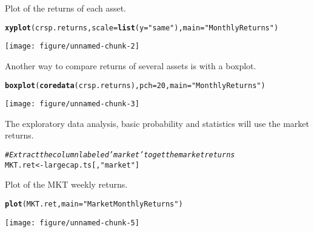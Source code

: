 \documentclass[a4paper]{article}\usepackage[]{graphicx}\usepackage[]{color}
\makeatletter
\def\maxwidth{ %
  \ifdim\Gin@nat@width>\linewidth
    \linewidth
  \else
    \Gin@nat@width
  \fi
}
\newcommand{\hlstr}[1]{\textcolor[rgb]{0.192,0.494,0.8}{#1}}%
\newcommand{\hlcom}[1]{\textcolor[rgb]{0.678,0.584,0.686}{\textit{#1}}}%
\newcommand{\hlkwd}[1]{\textcolor[rgb]{0.737,0.353,0.396}{\textbf{#1}}}%
\newenvironment{kframe}{%
 \def\at@end@of@kframe{}%
 \ifinner\ifhmode%
  \def\at@end@of@kframe{\end{minipage}}%
  \begin{minipage}{\columnwidth}%
 \fi\fi%
 \def\FrameCommand##1{\hskip\@totalleftmargin \hskip-\fboxsep
 \colorbox{shadecolor}{##1}\hskip-\fboxsep
     \hskip-\linewidth \hskip-\@totalleftmargin \hskip\columnwidth}%
 \MakeFramed {\advance\hsize-\width
   \@totalleftmargin\z@ \linewidth\hsize
   \@setminipage}}%
 {\par\unskip\endMakeFramed%
 \at@end@of@kframe}
\newenvironment{knitrout}{}{} %
\makeatother
\begin{document}
Plot of the returns of each asset.
\begin{knitrout}
\color{fgcolor}\begin{kframe}
\begin{alltt}
\hlkwd{xyplot}(crsp.returns, scale = \hlkwd{list}(y = \hlstr{"same"}), main = \hlstr{"Monthly Returns"})
\end{alltt}
\end{kframe}
\texttt{[image: figure/unnamed-chunk-2]} 

\end{knitrout}


Another way to compare returns of several assets is with a boxplot.
\begin{knitrout}
\color{fgcolor}\begin{kframe}
\begin{alltt}
\hlkwd{boxplot}(\hlkwd{coredata}(crsp.returns), pch = 20, main = \hlstr{"Monthly Returns"})
\end{alltt}
\end{kframe}
\texttt{[image: figure/unnamed-chunk-3]} 

\end{knitrout}


The exploratory data analysis, basic probability and statistics will use the market returns.
\begin{knitrout}
\color{fgcolor}\begin{kframe}
\begin{alltt}
\hlcom{# Extract the column labeled 'market' to get the market returns}
MKT.ret <- largecap.ts[, \hlstr{"market"}]
\end{alltt}
\end{kframe}
\end{knitrout}



Plot of the MKT weekly returns. 
\begin{knitrout}
\color{fgcolor}\begin{kframe}
\begin{alltt}
\hlkwd{plot}(MKT.ret, main = \hlstr{"Market Monthly Returns"})
\end{alltt}
\end{kframe}
\texttt{[image: figure/unnamed-chunk-5]} 

\end{knitrout}
\end{document}
